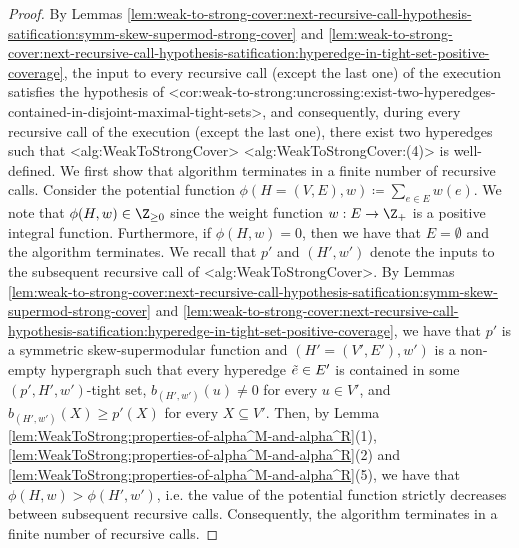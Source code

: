 \documentclass{article}
\def\Cref#1{<#1>}%
\begin{document}
\begin{proof}
By Lemmas \ref{lem:weak-to-strong-cover:next-recursive-call-hypothesis-satification:symm-skew-supermod-strong-cover} and \ref{lem:weak-to-strong-cover:next-recursive-call-hypothesis-satification:hyperedge-in-tight-set-positive-coverage}, the input to every recursive call (except the last one) of the execution satisfies the hypothesis of \Cref{cor:weak-to-strong:uncrossing:exist-two-hyperedges-contained-in-disjoint-maximal-tight-sets}, and consequently, during every recursive call of the execution (except the last one), there exist two hyperedges such that \Cref{alg:WeakToStrongCover} \Cref{alg:WeakToStrongCover:(4)} is well-defined.
We first show that 
algorithm terminates in a finite number of recursive calls. 
Consider the potential function $\phi(H=(V, E), w) \coloneqq  \sum_{e \in E}w(e)$. We note that $\phi(H, w) \in \Z_{\geq 0}$ since the weight function $w:E\rightarrow\Z_+$ is a positive integral function. Furthermore, if $\phi(H, w) = 0$, then we have that $E = \emptyset$ and the algorithm terminates. We recall that $p'$ and $(H', w')$ denote the inputs to the subsequent recursive call of \Cref{alg:WeakToStrongCover}. 
By Lemmas \ref{lem:weak-to-strong-cover:next-recursive-call-hypothesis-satification:symm-skew-supermod-strong-cover} and \ref{lem:weak-to-strong-cover:next-recursive-call-hypothesis-satification:hyperedge-in-tight-set-positive-coverage}, we have that $p'$ is a symmetric skew-supermodular function and $(H' = (V', E'), w')$ is a non-empty hypergraph such that every hyperedge $\Tilde{e} \in E'$ is contained in some $(p', H', w')$-tight set, $b_{(H', w')}(u) \not = 0$ for every $u \in V'$, and $b_{(H', w')}(X) \geq p'(X)$ for every $X \subseteq V'$.
Then, by Lemma \ref{lem:WeakToStrong:properties-of-alpha^M-and-alpha^R}(1), \ref{lem:WeakToStrong:properties-of-alpha^M-and-alpha^R}(2) and \ref{lem:WeakToStrong:properties-of-alpha^M-and-alpha^R}(5), we have that $\phi(H, w) > \phi(H', w')$, i.e. the value of the potential function strictly decreases between subsequent recursive calls. Consequently, the algorithm terminates in a finite number of recursive calls.



\end{proof}
\end{document}
